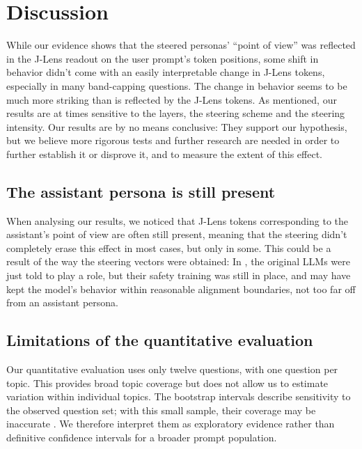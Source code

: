 \section{Discussion}
\label{sec:discussion}

While our evidence shows that the steered personas' ``point of view'' was reflected in the J-Lens readout on the user prompt's token positions, some shift in behavior didn't come with an easily interpretable change in J-Lens tokens, especially in many band-capping questions. The change in behavior seems to be much more striking than is reflected by the J-Lens tokens. As mentioned, our results are at times sensitive to the layers, the steering scheme and the steering intensity.
Our results are by no means conclusive: They support our hypothesis, but we believe more rigorous tests and further research are needed in order to further establish it or disprove it, and to measure the extent of this effect.

\subsection{The assistant persona is still present}
When analysing our results, we noticed that J-Lens tokens corresponding to the assistant's point of view are often still present, meaning that the steering didn't completely erase this effect in most cases, but only in some. This could be a result of the way the steering vectors were obtained: In \citet{lu2026assistant}, the original LLMs were just told to play a role, but their safety training was still in place, and may have kept the model's behavior within reasonable alignment boundaries, not too far off from an assistant persona.

\subsection{Limitations of the quantitative evaluation}
Our quantitative evaluation uses only twelve questions, with one question per topic. This provides broad topic coverage but does not allow us to estimate variation within individual topics. The bootstrap intervals describe sensitivity to the observed question set; with this small sample, their coverage may be inaccurate \citep{hesterberg2015bootstrap}. We therefore interpret them as exploratory evidence rather than definitive confidence intervals for a broader prompt population.

